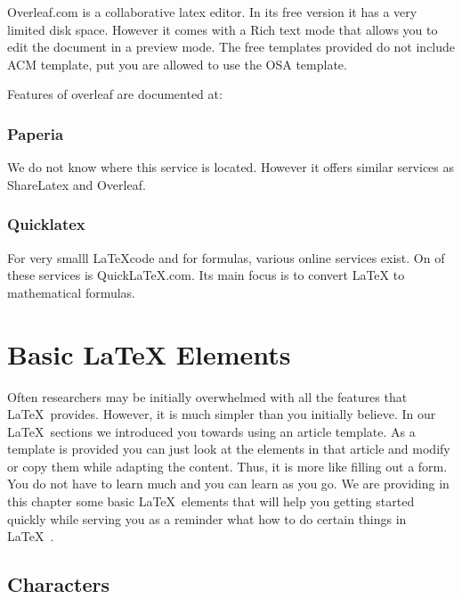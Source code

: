 Overleaf.com is a collaborative latex editor. In its free version it has
a very limited disk space. However it comes with a Rich text mode that
allows you to edit the document in a preview mode. The free templates
provided do not include ACM template, put you are allowed to use the OSA
template.

Features of overleaf are documented at:


\subsubsection{Paperia}\label{paperia}

We do not know where this service is located. However it offers similar
services as ShareLatex and Overleaf.


\subsubsection{Quicklatex}

For very smalll \LaTeX code and for formulas, various online services
exist. On of these services is QuickLaTeX.com. Its main focus is to
convert LaTeX to mathematical formulas.


\section{Basic LaTeX Elements}\label{latex}

Often researchers may be initially overwhelmed with all the features
that \LaTeX~provides. However, it is much simpler than you initially
believe. In our \LaTeX~sections we introduced you towards using an article
template. As a template is provided you can just look at the elements
in that article and modify or copy them while adapting the
content. Thus, it is more like filling out a form. You do not have to
learn much and you can learn as you go. We are providing in this
chapter some basic \LaTeX~elements that will help you getting started
quickly while serving you as a reminder what how to do certain things
in \LaTeX~.



\subsection{Characters}\label{characters}

